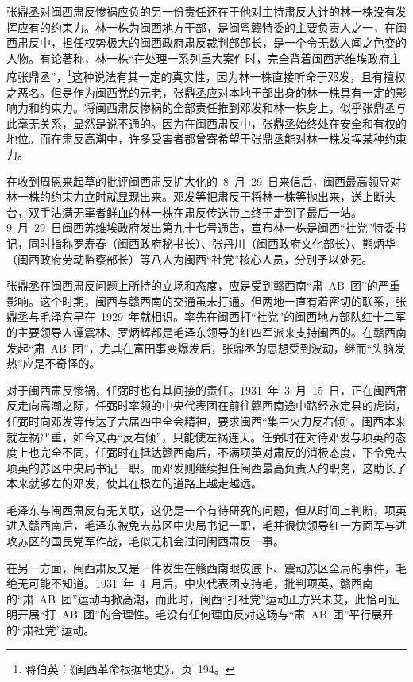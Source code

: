 张鼎丞对闽西肃反惨祸应负的另一份责任还在于他对主持肃反大计的林一株没有发挥应有的约束力。林一株为闽西地方干部，是闽粤赣特委的主要负责人之一，在闽西肃反中，担任权势极大的闽西政府肃反裁判部部长，是一个令无数人闻之色变的人物。有论著称，林一株“在处理一系列重大案件时，完全背着闽西苏维埃政府主席张鼎丞”，\footnote{蒋伯英：《闽西革命根据地史》，页~194。}这种说法有其一定的真实性，因为林一株直接听命于邓发，且有擅权之恶名。但是作为闽西党的元老，张鼎丞应对本地干部出身的林一株具有一定的影响力和约束力。将闽西肃反惨祸的全部责任推到邓发和林一株身上，似乎张鼎丞与此毫无关系，显然是说不通的。因为在闽西肃反中，张鼎丞始终处在安全和有权的地位。而在肃反高潮中，许多受害者都曾寄希望于张鼎丞能对林一株发挥某种约束力。

在收到周恩来起草的批评闽西肃反扩大化的~8~月~29~日来信后，闽西最高领导对林一株的约束力立时就显现出来。邓发等把肃反干将林一株等抛出来，送上断头台，双手沾满无辜者鲜血的林一株在肃反传送带上终于走到了最后一站。9~月~29~日闽西苏维埃政府发出第九十七号通告，宣布林一株是闽西“社党”特委书记，同时指称罗寿春（闽西政府秘书长）、张丹川（闽西政府文化部长）、熊炳华（闽西政府劳动监察部长）等八人为闽西“社党”核心人员，分别予以处死。

张鼎丞在闽西肃反问题上所持的立场和态度，应是受到赣西南“肃~AB~团”的严重影响。这个时期，闽西与赣西南的交通虽未打通。但两地一直有着密切的联系，张鼎丞与毛泽东早在~1929~年就相识。率先在闽西打“社党”的闽西地方部队红十二军的主要领导人谭震林、罗炳辉都是毛泽东领导的红四军派来支持闽西的。在赣西南发起“肃~AB~团”，尤其在富田事变爆发后，张鼎丞的思想受到波动，继而“头脑发热”应是不奇怪的。

对于闽西肃反惨祸，任弼时也有其间接的责任。1931~年~3~月~15~日，正在闽西肃反走向高潮之际，任弼时率领的中央代表团在前往赣西南途中路经永定县的虎岗，任弼时向邓发等传达了六届四中全会精神，要求闽西“集中火力反右倾”。闽西本来就左祸严重，如今又再“反右倾”，只能使左祸连天。任弼时在对待邓发与项英的态度上也完全不同，任弼时在抵达赣西南后，不满项英对肃反的消极态度，下令免去项英的苏区中央局书记一职。而邓发则继续担任闽西最高负责人的职务，这助长了本来就够左的邓发，使其在极左的道路上越走越远。

毛泽东与闽西肃反有无关联，这仍是一个有待研究的问题，但从时间上判断，项英进入赣西南后，毛泽东被免去苏区中央局书记一职，毛并很快领导红一方面军与进攻苏区的国民党军作战，毛似无机会过问闽西肃反一事。

在另一方面，闽西肃反又是一件发生在赣西南眼皮底下、震动苏区全局的事件，毛绝无可能不知道。1931~年~4~月后，中央代表团支持毛，批判项英，赣西南的“肃~AB~团”运动再掀高潮，而此时，闽西“打社党”运动正方兴未艾，此恰可证明开展“打~AB~团”的合理性。毛没有任何理由反对这场与“肃~AB~团”平行展开的“肃社党”运动。

